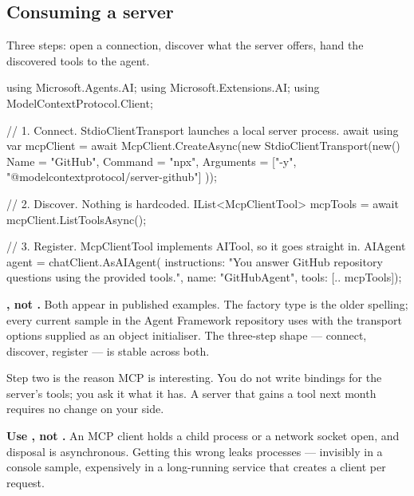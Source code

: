 \subsection{Consuming a server}
\label{sec:mcp-client}

Three steps: open a connection, discover what the server offers, hand the
discovered tools to the agent.

\begin{csharp}[caption={An agent backed by an external MCP server}, label={lst:mcp-client}]
using Microsoft.Agents.AI;
using Microsoft.Extensions.AI;
using ModelContextProtocol.Client;

// 1. Connect. StdioClientTransport launches a local server process.
await using var mcpClient = await McpClient.CreateAsync(new StdioClientTransport(new()
{
    Name = "GitHub",
    Command = "npx",
    Arguments = ["-y", "@modelcontextprotocol/server-github"]
}));

// 2. Discover. Nothing is hardcoded.
IList<McpClientTool> mcpTools = await mcpClient.ListToolsAsync();

// 3. Register. McpClientTool implements AITool, so it goes straight in.
AIAgent agent = chatClient.AsAIAgent(
    instructions: "You answer GitHub repository questions using the provided tools.",
    name: "GitHubAgent",
    tools: [.. mcpTools]);
\end{csharp}

\begin{note}
\textbf{, not .}
Both appear in published examples. The factory type is the older spelling; every
current sample in the Agent Framework repository uses 
with the transport options supplied as an object initialiser. The three-step
shape --- connect, discover, register --- is stable across both.
\end{note}

Step two is the reason MCP is interesting. You do not write bindings for the
server's tools; you ask it what it has. A server that gains a tool next month
requires no change on your side.

\begin{warning}
\textbf{Use , not .} An MCP client holds a child
process or a network socket open, and disposal is asynchronous. Getting this
wrong leaks processes --- invisibly in a console sample, expensively in a
long-running service that creates a client per request.
\end{warning}

